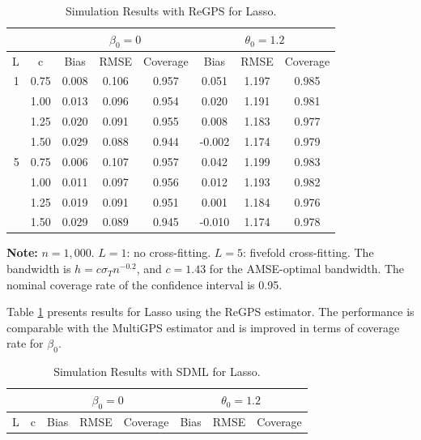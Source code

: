 \documentclass[lettersize, 12pt]{article}
\begin{document}
{       \begin{table}
        \caption{\label{TDGP-regps}Simulation Results with ReGPS for Lasso.}
        \begin{center}
         \begin{tabular*}{0.78\textwidth}{@{}rc|ccc|ccc@{}}
          \hline\hline
		&\multicolumn{1}{c}{} &\multicolumn{3}{c}{$\beta_0=0$}     
		&\multicolumn{3}{c}{$\theta_0=1.2$}     \\
		\hline
		 L     &\multicolumn{1}{c}{c} & Bias  & RMSE  & \multicolumn{1}{c}{Coverage} 
		 & Bias  & RMSE  & \multicolumn{1}{c}{Coverage} \\
\hline
\hline
	   1    & 0.75  & 0.008 & 0.106 & 0.957   & 0.051 & 1.197 & 0.985 \\
                 & 1.00  & 0.013 & 0.096 & 0.954 & 0.020 & 1.191 & 0.981\\
                 & 1.25  & 0.020 & 0.091 & 0.955 & 0.008 & 1.183 & 0.977\\
                 & 1.50  & 0.029 & 0.088 & 0.944  & -0.002 & 1.174 & 0.979\\
    \hline
           5    & 0.75  & 0.006 & 0.107 & 0.957 & 0.042 & 1.199 & 0.983\\
                 & 1.00  & 0.011 & 0.097 & 0.956 & 0.012 & 1.193 & 0.982\\
                 & 1.25  & 0.019 & 0.091 & 0.951 & 0.001 & 1.184 & 0.976\\
                 & 1.50  & 0.029 & 0.089 & 0.945 & -0.010 & 1.174 & 0.978\\
         \hline\hline
         \end{tabular*}
       \end{center}
       \footnotesize
       \renewcommand{\baselineskip}{11pt}
       \textbf{Note:} $n=1,000$.  $L=1$: no cross-fitting.  $L=5$: fivefold cross-fitting. 
		The bandwidth is $h = c \sigma_T n^{-0.2}$, and $c = 1.43$ for the AMSE-optimal bandwidth.  
		The nominal coverage rate of the confidence interval is 0.95.
       \end{table}
 

Table \ref{TDGP-regps} presents results for Lasso using the ReGPS estimator. The performance
is comparable with the MultiGPS estimator and 
is improved in terms of coverage rate for $\beta_0$.


       \begin{table}
        \caption{\label{TDGP-SDML}Simulation Results with SDML for Lasso.}
        \begin{center}
         \begin{tabular*}{0.78\textwidth}{@{}rc|ccc|ccc@{}}
          \hline\hline
		&\multicolumn{1}{c}{} &\multicolumn{3}{c}{$\beta_0=0$}     
		&\multicolumn{3}{c}{$\theta_0=1.2$}     \\
		\hline
		 L     &\multicolumn{1}{c}{c} & Bias  & RMSE  & \multicolumn{1}{c}{Coverage} 
		 & Bias  & RMSE  & \multicolumn{1}{c}{Coverage} \\
\hline
\hline



\end{tabular*}
\end{center}
\end{table}}
\end{document}
